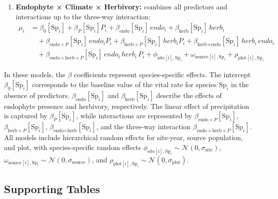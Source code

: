 \documentclass[12pt]{article}\usepackage[]{graphicx}\usepackage[dvipsnames]{xcolor}
\begin{document}
{\begin{enumerate}
    \item \textbf{Endophyte × Climate × Herbivory:} combines all predictors and interactions up to the three-way interaction:
    \begin{align*}
    \mu_i &= \beta_0[\text{Sp}_i] + \beta_P[\text{Sp}_i] P_i + \beta_{\text{endo}}[\text{Sp}_i]\,endo_i + \beta_{\text{herb}}[\text{Sp}_i]\,herb_i \\
    &\quad + \beta_{\text{endo}\times P}[\text{Sp}_i]\,endo_i P_i 
          + \beta_{\text{herb}\times P}[\text{Sp}_i]\,herb_i P_i
          + \beta_{\text{herb}\times \text{endo}}[\text{Sp}_i]\,herb_i\,endo_i \\
    &\quad + \beta_{\text{endo}\times \text{herb} \times P}[\text{Sp}_i]\,endo_i\,herb_i\,P_i
          + \phi_{\text{site}[i],\text{Sp}_i} + \omega_{\text{source}[i],\text{Sp}_i} + \rho_{\text{plot}[i],\text{Sp}_i}
    \end{align*}
\end{enumerate}

In these models, the $\beta$ coefficients represent species-specific effects. 
The intercept $\beta_0[\text{Sp}_i]$ corresponds to the baseline value of the vital rate for species $\text{Sp}_i$ in the absence of predictors. $\beta_{\text{endo}}[\text{Sp}_i]$ and $\beta_{\text{herb}}[\text{Sp}_i]$ describe the effects of endophyte presence and herbivory, respectively. The linear effect of precipitation is captured by $\beta_P[\text{Sp}_i]$, while interactions are represented by $\beta_{\text{endo}\times P}[\text{Sp}_i]$, $\beta_{\text{herb}\times P}[\text{Sp}_i]$, $\beta_{\text{endo}\times \text{herb}}[\text{Sp}_i]$, and the three-way interaction $\beta_{\text{endo}\times \text{herb} \times P}[\text{Sp}_i]$. 
All models include hierarchical random effects for site-year, source population, and plot, with species-specific random effects $\phi_{\text{site}[i],\text{Sp}_i} \sim \mathcal{N}(0, \sigma_{\text{site}})$, $\omega_{\text{source}[i],\text{Sp}_i} \sim \mathcal{N}(0, \sigma_{\text{source}})$, and $\rho_{\text{plot}[i],\text{Sp}_i} \sim \mathcal{N}(0, \sigma_{\text{plot}})$.
\clearpage 

\subsection{Supporting Tables}


\begin{table}
	\centering
	
	\caption{Geographic coordinates and descriptions of source populations for study species. For each source population, the table shows the total number of plants included in the experiment, the number of unique genotypes that these plants comrised, and the average amount of clonal replication per genotype.}
	\label{tab:source_pop}
\end{table}
\clearpage

}
\end{document}

